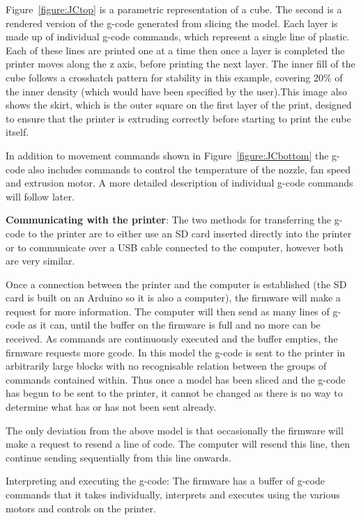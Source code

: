 \documentclass[11pt]{report} %
\begin{document}
Figure~\ref{figure:JCtop} is a parametric representation of a cube. The second is a rendered version of the g-code generated from slicing the model. Each layer is made up of individual g-code commands, which represent a single line of plastic. Each of these lines are printed one at a time then once a layer is completed the printer moves along the z axis, before printing the next layer. The inner fill of the cube follows a crosshatch pattern for stability in this example, covering 20\% of the inner density (which would have been specified by the user).This image also shows the skirt, which is the outer square on the first layer of the print, designed to ensure that the printer is extruding correctly before starting to print the cube itself.

In addition to movement commands shown in Figure~\ref{figure:JCbottom} the g-code also includes commands to control the temperature of the nozzle, fan speed and extrusion motor. A more detailed description of individual g-code commands will follow later.

\textbf{Communicating with the printer}: The two methods for transferring the g-code to the printer are to either use an SD card inserted directly into the printer or to communicate over a USB cable connected to the computer, however both are very similar.

Once a connection between the printer and the computer is established (the SD card is built on an Arduino so it is also a computer), the firmware will make a request for more information. The computer will then send as many lines of g-code as it can, until the buffer on the firmware is full and no more can be received. As commands are continuously executed and the buffer empties, the firmware requests more gcode. In this model the g-code is sent to the printer in arbitrarily large blocks with no recognisable relation between the groups of commands contained within. Thus once a model has been sliced and the g-code has begun to be sent to the printer, it cannot be changed as there is no way to determine what has or has not been sent already.

The only deviation from the above model is that occasionally the firmware will make a request to resend a line of code. The computer will resend this line, then continue sending sequentially from this line onwards. 

Interpreting and executing the g-code: The firmware has a buffer of g-code commands that it takes individually, interprets and executes using the various motors and controls on the printer. 
\end{document}
